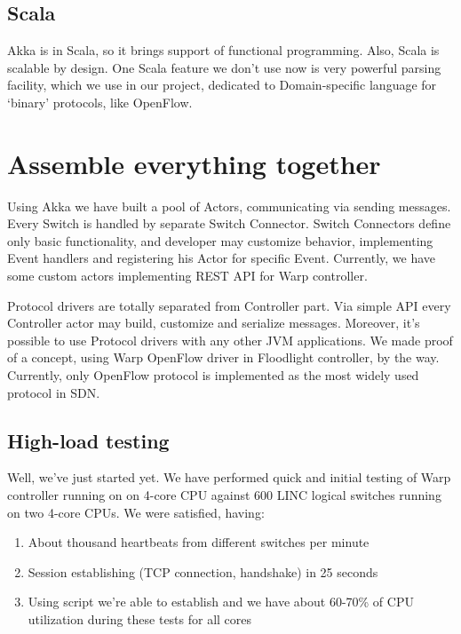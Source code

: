 \documentclass[10pt, a5paper]{article}
\begin{document}
\subsection*{Scala}

Akka is in Scala, so it brings support of functional programming.
Also, Scala is scalable by design. One Scala feature we don't use now is very powerful parsing facility, which we use in our project, dedicated to Domain-specific language for `binary' protocols, like OpenFlow.

\section*{Assemble everything together}

Using Akka we have built a pool of Actors, communicating via sending messages. Every Switch is handled by separate Switch Connector. Switch Connectors define only basic functionality, and developer may customize behavior, implementing Event handlers and registering his Actor for specific Event. Currently, we have some custom actors imple\-menting REST API for Warp controller.

Protocol drivers are totally separated from Controller part. Via simple API every Controller actor may build, customize and serialize messages. Moreover, it's possible to use Protocol drivers with any other JVM applications. We made proof of a concept, using Warp OpenFlow driver in Floodlight controller, by the way.
Currently, only OpenFlow protocol is implemented as the most widely used protocol in SDN.

\subsection*{High-load testing}

Well, we've just started yet. We have performed quick and initial testing of Warp controller running on on 4-core CPU against 600 LINC logical switches running on two 4-core CPUs. We were satisfied, having:

\begin{enumerate}
  \item About thousand heartbeats from different switches per minute
  \item Session establishing (TCP connection, handshake) in 25 seconds
  \item Using script we're able to establish and we have about 60-70\% of CPU utilization during these tests for all cores
\end{enumerate}
\end{document}
